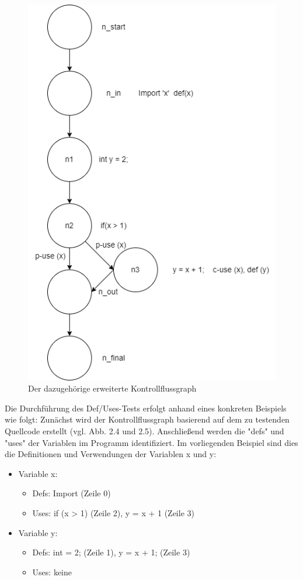 \documentclass[	%
		fontsize=11pt,  %
		a4paper,	    %
		ngerman,		%
		sans,			%
		f4,				%
	]{HsH-report}		%
\begin{document}
\begin{figure}
\begin{minipage}{0.49\textwidth}
		\includegraphics[width=1\textwidth]{DefsUses_Dia.png}
		\caption{Der dazugehörige erweiterte Kontrollflussgraph}
	\end{minipage}
\end{figure}

Die Durchführung des Def/Uses-Tests erfolgt anhand eines konkreten Beispiels
wie folgt: Zunächst wird der Kontrollflussgraph basierend auf dem zu testenden
Quellcode erstellt (vgl. Abb. 2.4 und 2.5). Anschließend werden die "defs" und
"uses" der Variablen im Programm identifiziert. Im vorliegenden Beispiel sind
dies die Definitionen und Verwendungen der Variablen x und y:

\begin{itemize}
	\item Variable x:
	      \begin{itemize}
		      \item Defs: Import (Zeile 0)
		      \item Uses: if (x > 1) (Zeile 2), y = x + 1 (Zeile 3)
	      \end{itemize}
	\item Variable y:
	      \begin{itemize}
		      \item Defs: int = 2; (Zeile 1), y = x + 1; (Zeile 3)
		      \item Uses: keine
	      \end{itemize}
\end{itemize}
\end{document}
